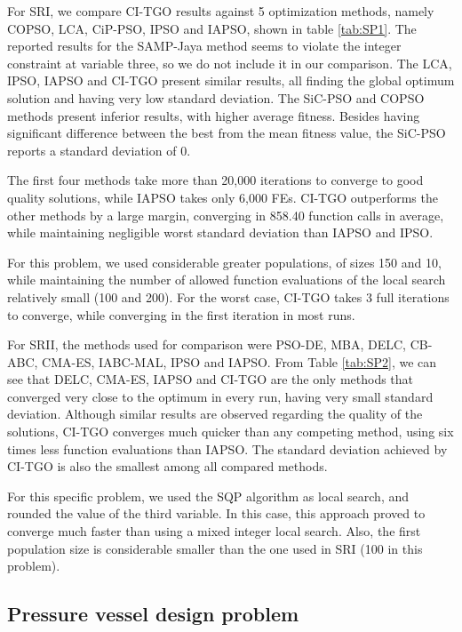 For SRI, we compare CI-TGO results against 5 optimization methods, namely COPSO, LCA, CiP-PSO, IPSO and IAPSO, shown in table \ref{tab:SP1}. The reported results for the SAMP-Jaya method seems to violate the integer constraint at variable three, so we do not include it in our comparison. The LCA, IPSO, IAPSO and CI-TGO present similar results, all finding the global optimum solution and having very low standard deviation. The SiC-PSO and COPSO methods present inferior results, with higher average fitness. Besides having significant difference between the best from the mean fitness value, the SiC-PSO reports a standard deviation of 0.



The first four methods take more than 20,000 iterations to converge to good quality solutions, while IAPSO takes only 6,000 FEs. CI-TGO outperforms the other methods by a large margin, converging in 858.40 function calls in average, while maintaining negligible worst standard deviation than IAPSO and IPSO.

For this problem, we used considerable greater populations, of sizes 150 and 10, while maintaining the number of allowed function evaluations of the local search relatively small (100 and 200). For the worst case, CI-TGO takes 3 full iterations to converge, while converging in the first iteration in most runs.

For SRII, the methods used for comparison were PSO-DE, MBA, DELC, CB-ABC, CMA-ES, IABC-MAL, IPSO and IAPSO. From Table \ref{tab:SP2}, we can see that DELC, CMA-ES, IAPSO and CI-TGO are the only methods that converged very close to the optimum in every run, having very small standard deviation. Although similar results are observed regarding the quality of the solutions, CI-TGO converges much quicker than any competing method, using six times less function evaluations than IAPSO. The standard deviation achieved by CI-TGO is also the smallest among all compared methods.



For this specific problem, we used the SQP algorithm as local search, and rounded the value of the third variable. In this case, this approach proved to converge much faster than using a mixed integer local search. Also, the first population size is considerable smaller than the one used in SRI (100 in this problem).



\subsection{Pressure vessel design problem}

